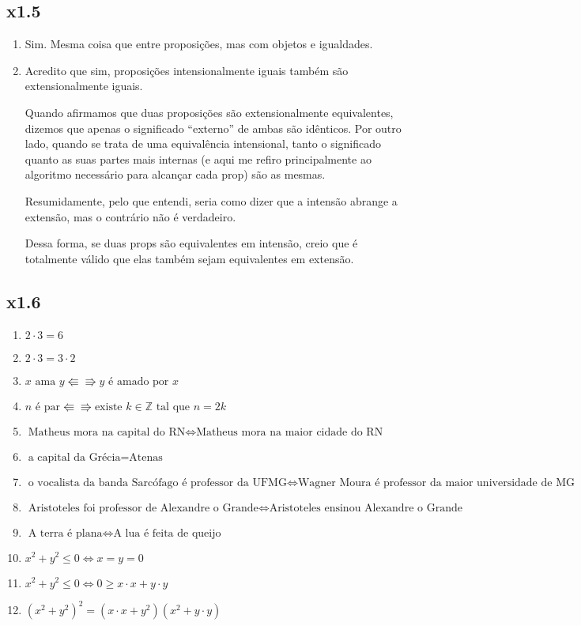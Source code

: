 \documentclass[portuguese,a4paper,12pt]{article}
\newcommand{\intiff}{\Lleftarrow\!\Rrightarrow}
\begin{document}
	\subsection*{x1.5}
	
	\begin{enumerate}[label=(\roman*)]
		\item Sim. Mesma coisa que entre proposições, mas com objetos e igualdades.

		\item Acredito que sim, proposições intensionalmente iguais também são extensionalmente iguais.
		
		Quando afirmamos que duas proposições são extensionalmente equivalentes, dizemos que apenas o significado ``externo'' de ambas são idênticos. Por outro lado, quando se trata de uma equivalência intensional, tanto o significado quanto as suas partes mais internas (e aqui me refiro principalmente ao algoritmo necessário para alcançar cada prop) são as mesmas.
		
		Resumidamente, pelo que entendi, seria como dizer que a intensão abrange a extensão, mas o contrário não é verdadeiro.
		
		Dessa forma, se duas props são equivalentes em intensão, creio que é totalmente válido que elas também sejam equivalentes em extensão.
	\end{enumerate}
	
	\subsection*{x1.6}
	
	\begin{enumerate}[label=(\arabic*)]
		\item $2 \cdot 3 = 6$
		\item $2 \cdot 3 = 3 \cdot 2$
		\item $x \text{ ama } y \intiff y \text{ é amado por } x$
		\item $n \text{ é par} \intiff \text{existe } k \in \mathbb{Z} \text{ tal que } n = 2k$
		\item $\text{Matheus mora na capital do RN} \iff \text{Matheus mora na maior cidade do RN}$
		\item $\text{a capital da Grécia} = \text{Atenas}$
		\item $\text{o vocalista da banda Sarcófago é professor da UFMG} \iff \text{Wagner Moura é professor da maior universidade de MG}$
		\item $\text{Aristoteles foi professor de Alexandre o Grande} \iff \text{Aristoteles ensinou Alexandre o Grande}$
		\item $\text{A terra é plana} \iff \text{A lua é feita de queijo}$
		\item $x^2 + y^2 \leq 0 \iff x = y = 0$
		\item $x^2 + y^2 \leq 0 \iff 0 \geq x \cdot x + y \cdot y$
		\item $(x^2 + y^2)^2 = (x \cdot x + y^2)(x^2 + y \cdot y)$
	\end{enumerate}
	
\end{document}
